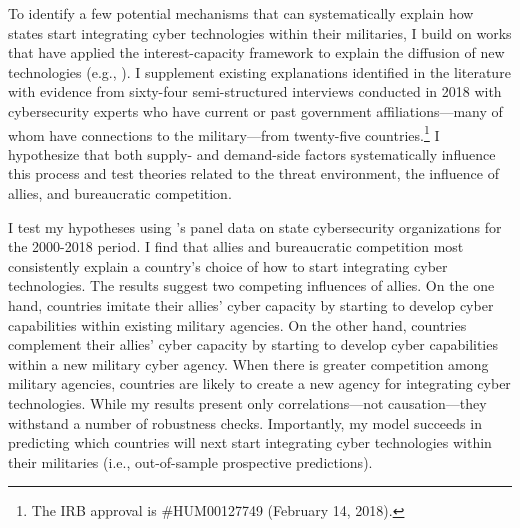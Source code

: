 \documentclass[12pt, letterpaper]{article}
\renewcommand{\baselinestretch}{1.35}
\let\oldfootnote\footnote
\renewcommand\footnote[1]{\oldfootnote{%
		\renewcommand\baselinestretch{.8}%
		\large\footnotesize\ignorespaces#1}} \addtolength{\footnotesep}{3pt}
\theoremstyle{plain}
\theoremstyle{remark}
\begin{document}
To identify a few potential mechanisms that can systematically explain how states start integrating cyber technologies within their militaries, I build on works that have applied the interest-capacity framework to explain the diffusion of new technologies (e.g., \citep{jo2007determinants, Fuhrmann2017, Kahn2022JCR}). I supplement existing explanations identified in the literature with evidence from sixty-four semi-structured interviews conducted in 2018 with cybersecurity experts who have current or past government affiliations—many of whom have connections to the military—from twenty-five countries.\footnote{The IRB approval is \#HUM00127749 (February 14, 2018).} I hypothesize that both supply- and demand-side factors systematically influence this process and test theories related to the threat environment, the influence of allies, and bureaucratic competition.


I test my hypotheses using \citet{Kostyuk2022MoD}'s panel data on state cybersecurity organizations for the 2000-2018 period. I find that allies and bureaucratic competition most consistently explain a country's choice of how to start integrating cyber technologies. The results suggest two competing influences of allies. On the one hand, countries imitate their allies' cyber capacity by starting to develop cyber capabilities within existing military agencies. On the other hand, countries complement their allies' cyber capacity by starting to develop cyber capabilities within a new military cyber agency. When there is greater competition among military agencies, countries are likely to create a new agency for integrating cyber technologies. While my results present only correlations—not causation—they withstand a number of robustness checks. Importantly, my model succeeds in predicting which countries will next start integrating cyber technologies within their militaries (i.e., out-of-sample prospective predictions).
\end{document}
